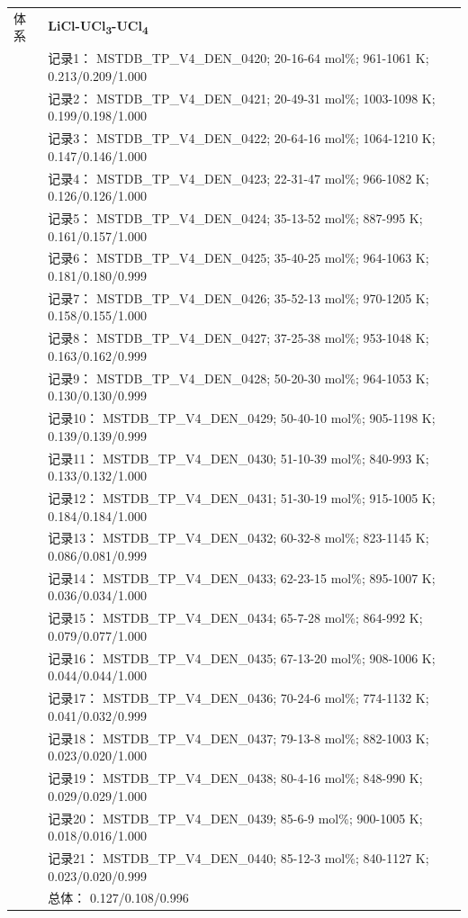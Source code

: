 \documentclass[12pt]{article}
\begin{document}
{\begin{longtable}[]{@{}
  >{\raggedright\arraybackslash}p{}
  >{\raggedright\arraybackslash}p{}@{}}
\midrule
体系 & \textbf{LiCl-UCl\textsubscript{3}-UCl\textsubscript{4}} \\
 & 记录1： MSTDB\_TP\_V4\_DEN\_0420; 20-16-64 mol\%; 961-1061 K; 0.213/0.209/1.000 \\
 & 记录2： MSTDB\_TP\_V4\_DEN\_0421; 20-49-31 mol\%; 1003-1098 K; 0.199/0.198/1.000 \\
 & 记录3： MSTDB\_TP\_V4\_DEN\_0422; 20-64-16 mol\%; 1064-1210 K; 0.147/0.146/1.000 \\
 & 记录4： MSTDB\_TP\_V4\_DEN\_0423; 22-31-47 mol\%; 966-1082 K; 0.126/0.126/1.000 \\
 & 记录5： MSTDB\_TP\_V4\_DEN\_0424; 35-13-52 mol\%; 887-995 K; 0.161/0.157/1.000 \\
 & 记录6： MSTDB\_TP\_V4\_DEN\_0425; 35-40-25 mol\%; 964-1063 K; 0.181/0.180/0.999 \\
 & 记录7： MSTDB\_TP\_V4\_DEN\_0426; 35-52-13 mol\%; 970-1205 K; 0.158/0.155/1.000 \\
 & 记录8： MSTDB\_TP\_V4\_DEN\_0427; 37-25-38 mol\%; 953-1048 K; 0.163/0.162/0.999 \\
 & 记录9： MSTDB\_TP\_V4\_DEN\_0428; 50-20-30 mol\%; 964-1053 K; 0.130/0.130/0.999 \\
 & 记录10： MSTDB\_TP\_V4\_DEN\_0429; 50-40-10 mol\%; 905-1198 K; 0.139/0.139/0.999 \\
 & 记录11： MSTDB\_TP\_V4\_DEN\_0430; 51-10-39 mol\%; 840-993 K; 0.133/0.132/1.000 \\
 & 记录12： MSTDB\_TP\_V4\_DEN\_0431; 51-30-19 mol\%; 915-1005 K; 0.184/0.184/1.000 \\
 & 记录13： MSTDB\_TP\_V4\_DEN\_0432; 60-32-8 mol\%; 823-1145 K; 0.086/0.081/0.999 \\
 & 记录14： MSTDB\_TP\_V4\_DEN\_0433; 62-23-15 mol\%; 895-1007 K; 0.036/0.034/1.000 \\
 & 记录15： MSTDB\_TP\_V4\_DEN\_0434; 65-7-28 mol\%; 864-992 K; 0.079/0.077/1.000 \\
 & 记录16： MSTDB\_TP\_V4\_DEN\_0435; 67-13-20 mol\%; 908-1006 K; 0.044/0.044/1.000 \\
 & 记录17： MSTDB\_TP\_V4\_DEN\_0436; 70-24-6 mol\%; 774-1132 K; 0.041/0.032/0.999 \\
 & 记录18： MSTDB\_TP\_V4\_DEN\_0437; 79-13-8 mol\%; 882-1003 K; 0.023/0.020/1.000 \\
 & 记录19： MSTDB\_TP\_V4\_DEN\_0438; 80-4-16 mol\%; 848-990 K; 0.029/0.029/1.000 \\
 & 记录20： MSTDB\_TP\_V4\_DEN\_0439; 85-6-9 mol\%; 900-1005 K; 0.018/0.016/1.000 \\
 & 记录21： MSTDB\_TP\_V4\_DEN\_0440; 85-12-3 mol\%; 840-1127 K; 0.023/0.020/0.999 \\
 & 总体： 0.127/0.108/0.996  \\


\end{longtable}}
\end{document}
